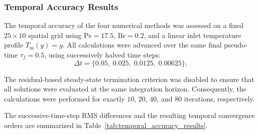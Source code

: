 \subsubsection{Temporal Accuracy Results}
\label{subsec:temporal_accuracy_results}

The temporal accuracy of the four numerical methods was
assessed on a fixed $25\times10$ spatial grid using
$\mathrm{Pe}=17.5$, $\mathrm{Br}=0.2$, and a linear inlet
temperature profile $T_{\mathrm{in}}(y)=y$. All calculations
were advanced over the same final pseudo-time $\tau_f=0.5$,
using successively halved time steps:
\begin{equation}
\Delta t=
\{0.05,\;0.025,\;0.0125,\;0.00625\}.
\end{equation}

The residual-based steady-state termination criterion was
disabled to ensure that all solutions were evaluated at the
same integration horizon. Consequently, the calculations
were performed for exactly $10$, $20$, $40$, and $80$
iterations, respectively.

The successive-time-step RMS differences and the resulting
temporal convergence orders are summarized in
Table~\ref{tab:temporal_accuracy_results}.

\begin{table}[H]
\centering
\caption{Temporal self-convergence results for the four
numerical methods.}
\label{tab:temporal_accuracy_results}
\small
\setlength{\tabcolsep}{5pt}
\renewcommand{\arraystretch}{1.3}
\end{table}

